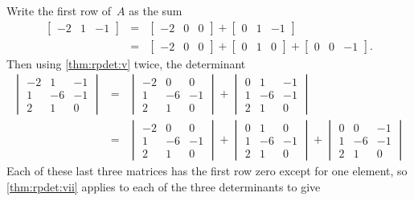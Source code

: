 \begin{example}
\begin{solution} 
Write the first row of~\(A\) as the sum 
\begin{eqnarray*}
\begin{bmatrix}-2&1&-1\end{bmatrix} &=&\begin{bmatrix}-2&0&0\end{bmatrix}+\begin{bmatrix}0&1&-1\end{bmatrix} \\&=&\begin{bmatrix}-2&0&0\end{bmatrix}+\begin{bmatrix}0&1&0\end{bmatrix}+\begin{bmatrix}0&0&-1\end{bmatrix}.
\end{eqnarray*}
Then using \cref{thm:rpdet:v} twice, the determinant
\begin{eqnarray*}
\begin{vmatrix}   -2&1&-1
\\   1 & -6 & -1
\\   2 &  1 & 0
\end{vmatrix}
&=&\begin{vmatrix}   -2&0&0
\\   1 & -6 & -1
\\   2 &  1 & 0
\end{vmatrix}
+\begin{vmatrix}   0&1&-1
\\   1 & -6 & -1
\\   2 &  1 & 0
\end{vmatrix}
\\&=&\begin{vmatrix}   -2&0&0
\\   1 & -6 & -1
\\   2 &  1 & 0
\end{vmatrix}
+\begin{vmatrix}   0&1&0
\\   1 & -6 & -1
\\   2 &  1 & 0
\end{vmatrix}
+\begin{vmatrix}   0&0&-1
\\   1 & -6 & -1
\\   2 &  1 & 0
\end{vmatrix}
\end{eqnarray*}
Each of these last three matrices has the first row zero except for one element, so \cref{thm:rpdet:vii} applies to each of the three determinants to give

\end{solution}
\end{example}

